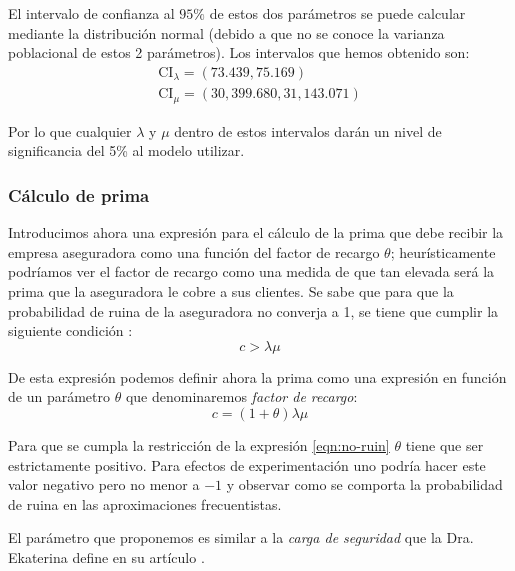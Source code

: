 \documentclass[journal]{IEEEtran}
\begin{document}
                El intervalo de confianza al $95\%$ de estos dos parámetros se puede calcular mediante la distribución normal (debido a que no se conoce la varianza poblacional de estos 2 parámetros). Los intervalos que hemos obtenido son:
                \begin{gather*}
                    \text{CI}_{\lambda} = \left(73.439, 75.169\right)\\
                    \text{CI}_{\mu} = \left(30,399.680, 31,143.071\right)
                \end{gather*}

                Por lo que cualquier $\lambda$ y $\mu$ dentro de estos intervalos darán un nivel de significancia del 5\% al modelo utilizar.

            \subsubsection{Cálculo de prima}

                Introducimos ahora una expresión para el cálculo de la prima que debe recibir la empresa aseguradora como una función del factor de recargo $\theta$; heurísticamente podríamos ver el factor de recargo como una medida de que tan elevada será la prima que la aseguradora le cobre a sus clientes. Se sabe que para que la probabilidad de ruina de la aseguradora no converja a 1, se tiene que cumplir la siguiente condición \cite{rolski2009stochastic}:
                \begin{equation}\label{eqn:no-ruin}
                    c > \lambda \mu
                \end{equation}

                De esta expresión podemos definir ahora la prima como una expresión en función de un parámetro $\theta$ que denominaremos \emph{factor de recargo}:
                \begin{equation}\label{eqn:def-theta}
                    c = (1 + \theta) \lambda \mu
                \end{equation}
                
                Para que se cumpla la restricción de la expresión \ref{eqn:no-ruin} $\theta$ tiene que ser estrictamente positivo. Para efectos de experimentación uno podría hacer este valor negativo pero no menor a $-1$ y observar como se comporta la probabilidad de ruina en las aproximaciones frecuentistas.

                El parámetro que proponemos es similar a la \emph{carga de seguridad} que la Dra. Ekaterina define en su artículo \cite{ekaterina}.
\end{document}
